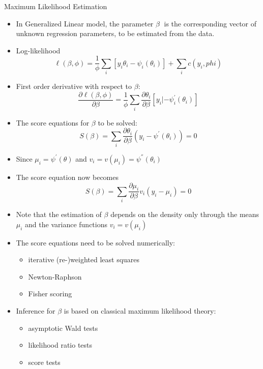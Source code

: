 \documentclass{beamer}
\begin{document}
\begin{frame}{Maximum Likelihood Estimation}
\begin{itemize}
	\item In Generalized Linear model, the parameter $\beta$  is the corresponding vector of unknown regression parameters, to be estimated
	from the data.
	\item Log-likelihood
	\[\ell(\beta,\phi)=\frac{1}{\phi}\sum_{i}\left[y_i\theta_i-\psi_i(\theta_i)\right] +\sum_{i}c(y_i,phi) \]
	\item First order derivative with respect to $\beta$:
	\[\frac{\partial\ell(\beta, \phi)}{\partial\beta}=\frac{1}{\phi}\sum_{i}\frac{\partial\theta_i}{\partial\beta}\left[y_i|-\psi_i^{'}(\theta_i)\right]\]
	\item The score equations for $\beta$ to be solved:
	\[S(\beta)=\sum_{i}\frac{\partial\theta_i}{\partial\beta}(y_i-\psi^{'}(\theta_i))=0 \]
\end{itemize}
\end{frame}

\begin{frame}{}
\begin{itemize}
	\item Since $\mu_i=\psi^{'}(\theta)$ and $v_i=v(\mu_i)=\psi^{''}(\theta_i)$
	\item The score equation now becomes
		\[S(\beta)=\sum_{i}\frac{\partial\mu_i}{\partial\beta}v_i(y_i-\mu_i)=0 \]
	\item Note that the estimation of $\beta$ depends on the density only through the means $\mu_i$ and the variance functions $v_i=v(\mu_i)$
	\item The score equations need to be solved numerically:
	\begin{itemize}
		\item iterative (re-)weighted least squares
		\item Newton-Raphson
		\item Fisher scoring
	\end{itemize}
\item Inference for $\beta$ is based on classical maximum likelihood theory:
\begin{itemize}
	\item asymptotic Wald tests
	\item likelihood ratio tests
	\item score tests
\end{itemize}
\end{itemize}
\end{frame}
\end{document}
